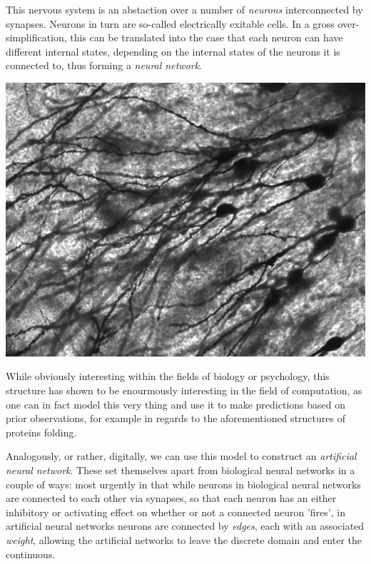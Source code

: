 This nervous system is an abstaction over a number of \textit{neurons} interconnected by 
synapses. Neurons in turn are so-called electrically exitable cells. In a gross over-simplification, this can be translated into the case that each neuron can have different internal states, depending on the internal states of the neurons it is connected to, thus forming a \textit{neural network}.


\begin{Figure}
 \centering
 \includegraphics[width=0.8\linewidth]{images/Gyrus_Dentatus_40x}
 \captionsetup{width=0.8\linewidth, font=small}
\end{Figure}

While obviously interesting within the fields of biology or psychology, this structure has shown 
to be enourmously interesting in the field of computation, as one can in fact model this very 
thing and use it to make predictions based on prior observations, for example in regards to the 
aforementioned structures of proteins folding.

Analogously, or rather, digitally, we can use this model to construct an \textit{artificial 
neural network}.
These set themselves apart from biological neural networks in a couple of ways: most urgently in that while neurons in biological neural networks are connected to each other via synapses, so that each neuron has an either inhibitory or activating effect on whether or not a connected neuron 'fires', in artificial neural networks neurons are connected by \textit{edges}, each with an associated \textit{weight}, allowing the artificial networks to leave the discrete domain and enter the continuous.

